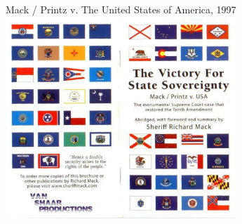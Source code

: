 %
%

\begin{frame}{Mack / Printz v. The United States of America, 1997}
    \centering
    \includegraphics[width=0.65\textwidth]{img/printz-mack.jpg} \\
\end{frame}

